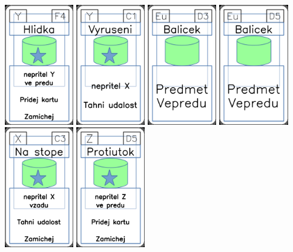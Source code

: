 \documentclass[a4paper]{article}
\begin{document}
	\includegraphics[width=3.0cm]{img-5_28}
	\includegraphics[width=3.0cm]{img-5_40}
	\includegraphics[width=3.0cm]{img-4_17}
	\includegraphics[width=3.0cm]{img-4_19}
	\includegraphics[width=3.0cm]{img-5_12}
	\includegraphics[width=3.0cm]{img-5_49}
\end{document}
